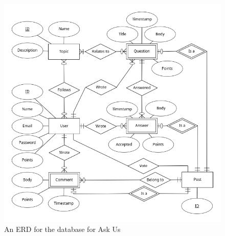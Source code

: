 \begin{figure}[p]
	\centering
	\includegraphics[width=\linewidth]{../../ERD/erd.png}
	\caption{An ERD for the database for Ask Us}
	\label{erd}
\end{figure}